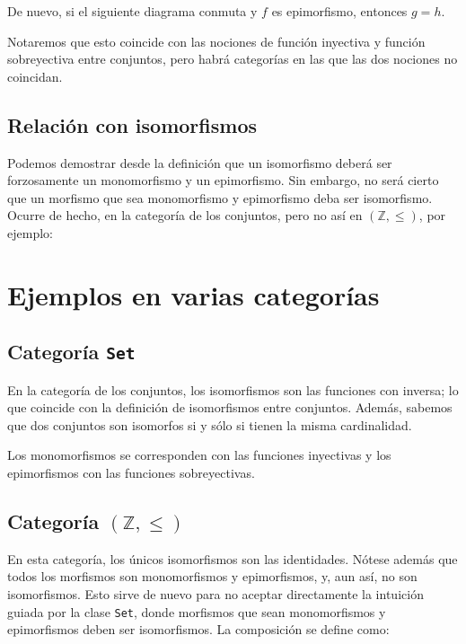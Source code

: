 \documentclass[11pt, fleqn, spanish]{book}
\begin{document}
De nuevo, si el siguiente diagrama conmuta y $f$ es epimorfismo, entonces $g=h$.

\begin{center}
\end{center}

Notaremos que esto coincide con las nociones de función inyectiva y
función sobreyectiva entre conjuntos, pero habrá categorías en las que
las dos nociones no coincidan.

\subsection{Relación con isomorfismos}
Podemos demostrar desde la definición que un isomorfismo deberá ser
forzosamente un monomorfismo y un epimorfismo. Sin embargo, no será
cierto que un morfismo que sea monomorfismo y epimorfismo deba ser
isomorfismo. Ocurre de hecho, en la categoría de los conjuntos,
pero no así en $(\mathbb{Z},\leq)$, por ejemplo:


\section {Ejemplos en varias categorías}
\subsection{Categoría \texttt{Set}}
En la categoría de los conjuntos, los isomorfismos son las funciones
con inversa; lo que coincide con la definición de isomorfismos entre
conjuntos. Además, sabemos que dos conjuntos son isomorfos si y sólo
si tienen la misma cardinalidad.

Los monomorfismos se corresponden con las funciones
inyectivas y los epimorfismos con las funciones sobreyectivas.
    
\subsection{Categoría \texttt{$(\mathbb{Z},\leq)$}}
En esta categoría, los únicos isomorfismos son las identidades. Nótese
además que todos los morfismos son monomorfismos y epimorfismos, y,
aun así, no son isomorfismos. Esto sirve de nuevo para no aceptar
directamente la intuición guiada por la clase \texttt{Set}, donde
morfismos que sean monomorfismos y epimorfismos deben ser
isomorfismos. La composición se define como:
\end{document}
